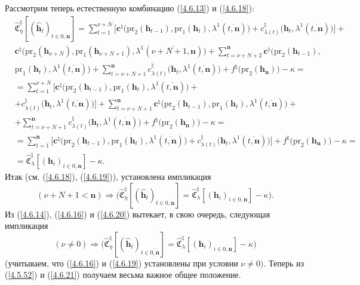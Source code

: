\documentclass[11pt,twoside,openany]{report}
\newcommand{\bfn}{\begin{equation}}
\newcommand{\efn}{\end{equation}}
\newcommand{\ov}{\overline}
\newcommand{\la}{\lambda}
\newcommand{\zc}{{\mathbf c}}
\newcommand{\nn}{{\mathbf n}}
\begin{document}
{{Рассмотрим теперь естественную комбинацию (\ref{4.6.13}) и (\ref{4.6.18}):
\begin{eqnarray}
&\widehat{\mathfrak{C}}_\eta^\natural[(\hat{\mathbf{h}}_t)_{t\in\ov{0,\nn}}]=
 \sum\limits_{t=1}^{\nu+N}\bigl[\zc^\natural\bigl(\mathrm{pr}_2(\mathbf{h}_{t-1}),\mathrm{pr}_1
 (\mathbf{h}_t), \la^1(\ov{t,\nn})\bigl) + c_{\la(t)}^\natural\bigl(\mathbf{h}_t,\la^1(\ov{t,\nn})\bigl)\bigl] +
&\nonumber\\
&\zc^\natural\bigl(\mathrm{pr}_2(\mathbf{h}_{\nu+N}),
\mathrm{pr}_1(\mathbf{h}_{\nu+N+1}), \la^1(\ov{\nu+N+1,\nn})\bigl)+
\sum\limits_{t=\nu+N+2}^\nn\zc^\natural\bigl(\mathrm{pr}_2(\mathbf{h}_{t-1}),
&\nonumber\\
&\mathrm{pr}_1
(\mathbf{h}_t), \la^1(\ov{t,\nn})\bigl) + \sum\limits_{t=\nu+N+1}^\nn
c_{\la(t)}^\natural\bigl(\mathbf{h}_t,\la^1(\ov{t,\nn})\bigl)
+f^\natural\bigl(\mathrm{pr}_2(\mathbf{h}_\nn)\bigl) - \kappa =
&\nonumber\\
&=\sum\limits_{t=1}^{\nu+N}\bigl[\zc^\natural
(\mathrm{pr}_2(\mathbf{h}_{t-1}),\mathrm{pr}_1(\mathbf{h}_t), \la^1(\ov{t,\nn})\bigl) +
&\nonumber\\
&+c_{\la(t)}^{\natural}\bigl(\mathbf{h}_t,\la^1(\ov{t,\nn})\bigl)\bigl]
+\sum\limits_{t=\nu+N+1}^\nn\zc^\natural\bigl(\mathrm{pr}_2(\mathbf{h}_{t-1}),\mathrm{pr}_1
(\mathbf{h}_t),\la^1(\ov{t,\nn})\bigl) +
&\nonumber\\
&+\sum\limits_{t=\nu+N+1}^\nn c_{\la(t)}^\natural\bigl(\mathbf{h}_t,\la^1(\ov{t,\nn})\bigl)
+f^\natural\bigl(\mathrm{pr}_2(\mathbf{h}_\nn)\bigl) - \kappa  =
&\nonumber\\
&=\sum\limits_{t=1}^\nn \bigl[\zc^\natural\bigl(\mathrm{pr}_2(\mathbf{h}_{t-1}),\mathrm{pr}_1(\mathbf{h}_t),
\la^1(\ov{t,\nn})\bigl) + c_{\la(t)}^\natural(\mathbf{h}_t,\la^1(\ov{t,\nn})\bigl)\bigl] +
f^\natural\bigl(\mathrm{pr}_2(\mathbf{h}_\nn)\bigl) - \kappa=
&\nonumber\\
&= \widehat{\mathfrak{C}}_\la^\natural[(\mathbf{h}_i)_{i\in\ov{0,\nn}}]
 - \kappa.
&\label{4.6.19}
\end{eqnarray}
Итак (см. (\ref{4.6.18}), (\ref{4.6.19})), установлена импликация
\bfn\label{4.6.20}
(\nu+N+1 < \nn)\Longrightarrow \bigl(\widehat{\mathfrak{C}}_\eta^\natural[(\hat{\mathbf{h}}_t)_{t\in\ov{0,\nn}}] =
\widehat{\mathfrak{C}}_\la^\natural[(\mathbf{h}_i)_{i\in\ov{0,\nn}}]  - \kappa\bigl).
\efn
Из (\ref{4.6.14}), (\ref{4.6.16}) и (\ref{4.6.20}) вытекает, в свою очередь, следующая импликация
\bfn\label{4.6.21}(\nu\neq 0) \Longrightarrow
\bigl(\widehat{\mathfrak{C}}_\eta^\natural[(\hat{\mathbf{h}}_t)_{t\in\ov{0,\nn}}] =
\widehat{\mathfrak{C}}_\la^\natural[(\mathbf{h}_i)_{i\in\ov{0,\nn}}]  - \kappa\bigl)
\efn
(учитываем, что (\ref{4.6.16}) и (\ref{4.6.19}) установлены при условии $\nu \neq 0).$
Теперь из (\ref{4.5.52}) и (\ref{4.6.21}) получаем весьма важное общее положение.

}}
\end{document}
